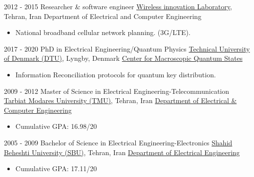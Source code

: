\documentclass[letterpaper]{hosmacv} %
\begin{document}
\begin{hosmaenv}
    \hosmaitem
    	{2012 - 2015}
        {Researcher \& software engineer}
        {\href{https://www.modares.ac.ir/en-ece}{Wireless innovation Laboratory}, Tehran, Iran}
        {{Department of  Electrical and Computer Engineering}}
        {\begin{itemize} \itemsep -2pt %
            \item National broadband cellular network planning. (3G/LTE).
        \end{itemize}}
        
	
\end{hosmaenv}



\begin{hosmaenv} %
	\hosmaitem
    	{2017 - 2020}
        {PhD in Electrical Engineering/Quantum Physics}
        {\href{https://www.dtu.dk/english}{Technical University of Denmark (DTU)}, Lyngby, Denmark}
        {\href{https://www.bigq.fysik.dtu.dk/about-bigq}{Center for Macroscopic Quantum States}}
        {\begin{itemize}
            \item Information Reconciliation protocols for quantum key distribution.
        \end{itemize}}
	
	\hosmaitem
    	{2009 - 2012}
        {Master of Science in Electrical Engineering-Telecommunication}
        {\href{https://modares.ac.ir/en}{Tarbiat Modares University (TMU)}, Tehran, Iran}
        {\href{https://www.modares.ac.ir/en-ece}{Department of Electrical \& Computer Engineering}}
        {\begin{itemize}
            \item Cumulative GPA: 16.98/20
        \end{itemize}}
    
    \hosmaitem
    	{2005 - 2009}
        {Bachelor of Science in Electrical Engineering-Electronics}
        {\href{http://www.ufabc.edu.br/}{Shahid Beheshti University (SBU)}, Tehran, Iran}
        {\href{http://en.sbu.ac.ir/Faculties/Electrical/Pages/default.aspx}{Department of Electrical Engineering}}
        {\begin{itemize}
            \item Cumulative GPA: 17.11/20
        \end{itemize}}
	
\end{hosmaenv}
\end{document}
